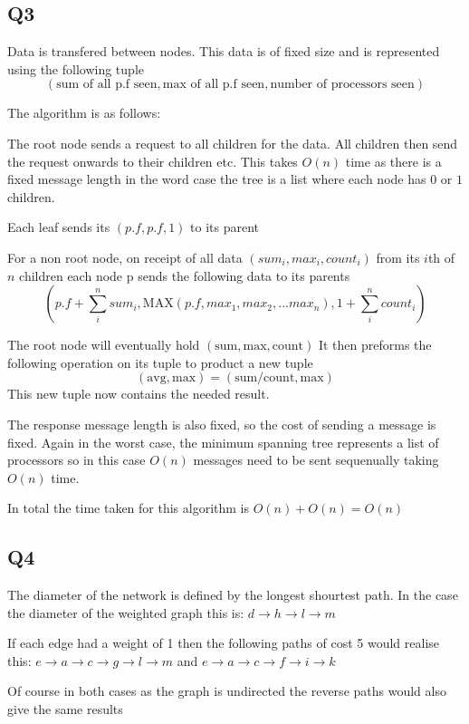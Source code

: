 \documentclass[11pt]{article}
\begin{document}
\subsection*{Q3}

Data is transfered between nodes. This data is of fixed size and is represented using the following tuple
$$
(\text{sum of all p.f seen}, \text{max of all p.f seen}, \text{number of processors seen})
$$

The algorithm is as follows:

The root node sends a request to all children for the data. All children then send the request onwards to their children etc. This takes $O(n)$ time as there is a fixed message length in the word case the tree is a list where each node has $0$ or $1$ children.

Each leaf sends its $(p.f, p.f, 1)$ to its parent

For a non root node, on receipt of all data $(sum_i, max_i, count_i)$ from its $i$th of $n$ children each node p sends the following data to its parents 
$$(p.f + \sum_i^n sum_i, \text{MAX}(p.f, max_1, max_2, ... max_n), 1 + \sum_i^n count_i)$$

The root node will eventually hold $(\text{sum}, \text{max}, \text{count})$
It then preforms the following operation on its tuple to product a new tuple 
$$(\text{avg}, \text{max}) = (\text{sum/count}, \text{max})$$
This new tuple now contains the needed result.

The response message length is also fixed, so the cost of sending a message is fixed.
Again in the worst case, the minimum spanning tree represents a list of processors so in this case $O(n)$ messages need to be sent sequenually taking $O(n)$ time.

In total the time taken for this algorithm is $O(n) + O(n) = O(n)$

\subsection*{Q4}
The diameter of the network is defined by the longest shourtest path. In the case
the diameter of the weighted graph this is:
$d \rightarrow h \rightarrow l \rightarrow m$

If each edge had a weight of 1 then the following paths of cost 5 would realise this:
$ e \rightarrow a \rightarrow c \rightarrow g \rightarrow l \rightarrow m$ and
$e \rightarrow a \rightarrow c \rightarrow f \rightarrow i \rightarrow k$

Of course in both cases as the graph is undirected the reverse paths would also give the same results
\end{document}
